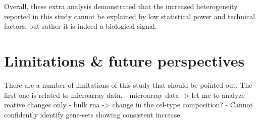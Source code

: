 Overall, these extra analysis demonstrated that the increased heterogeneity reported in this study cannot be explained by low statistical power and technical factors,
but rather it is indeed a biological signal.

\section{Limitations \& future perspectives}
There are a number of limitations of this study that should be pointed out. The first one is related to microarray data. 
- microarray data -> let me to analyze reative changes only
- bulk rna -> change in the cel-type composition?
- Cannot confidently identify gene-sets showing consistent increase.


